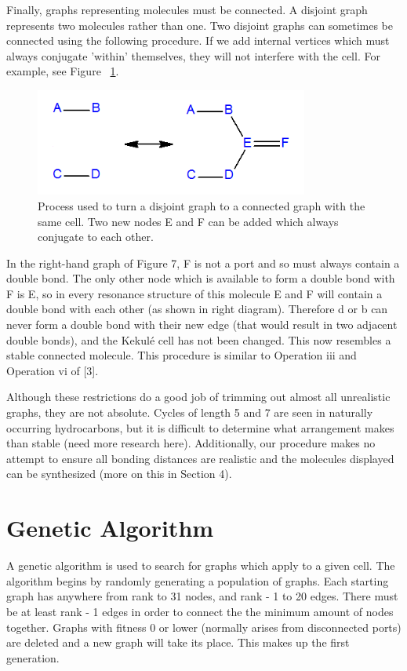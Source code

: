 \documentclass[12pt]{article}
\begin{document}
Finally, graphs representing molecules must be connected. A disjoint graph represents two molecules rather than one. Two disjoint graphs can sometimes be connected using the following procedure. If we add internal vertices which must always conjugate ’within’ themselves, they will not interfere with the cell. For example, see Figure ~\ref{fig:disjoint}.

\begin{figure}[ht!]
\centering
\includegraphics[width=90mm]{disjoint2.png}
\caption{Process used to turn a disjoint graph to a connected graph with the same cell. Two new nodes E and F can be added which always conjugate to each other.}
\label{fig:disjoint}
\end{figure}

In the right-hand graph of Figure 7, F is not a port and so must always contain a double bond. The only other node which is available to form a double bond with F is E, so in every resonance structure of this molecule E and F will contain a double bond with each other (as shown in right diagram). Therefore d or b can never form a double bond with their new edge (that would result in two adjacent double bonds), and the Kekul\'e cell has not been changed. This now resembles a stable connected molecule. This procedure is similar to Operation iii and Operation vi of [3].

Although these restrictions do a good job of trimming out almost all unrealistic graphs, they are not absolute. Cycles of length 5 and 7 are seen in naturally occurring hydrocarbons, but it is difficult to determine what arrangement makes than stable (need more research here). Additionally, our procedure makes no attempt to ensure all bonding distances are realistic and the molecules displayed can be synthesized (more on this in Section 4). 

\section{Genetic Algorithm}

A genetic algorithm is used to search for graphs which apply to a given cell. The algorithm begins by randomly generating a population of graphs. Each starting graph has anywhere from rank to 31 nodes, and rank - 1 to 20 edges. There must be at least rank - 1 edges in order to connect the the minimum amount of nodes together. Graphs with fitness 0 or lower (normally arises from disconnected ports) are deleted and a new graph will take its place. This makes up the first generation.
\end{document}
